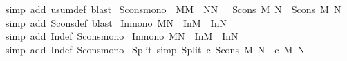 \begin{isabellebody}
%
\isadelimproof
%
\endisadelimproof
%
\isatagproof
{}\isamarkupfalse%
\ {\isacharparenleft}simp\ add{\isacharcolon}\ usum{\isacharunderscore}def{\isacharcomma}\ blast{\isacharparenright}%
\endisatagproof
{\isafoldproof}%
%
\isadelimproof
\isanewline
%
\endisadelimproof
\isanewline
{}\isamarkupfalse%
\ Scons{\isacharunderscore}mono{\isacharcolon}\ {\isachardoublequoteopen}{\isacharbrackleft}{\isacharbar}\ M{\isacharless}{\isacharequal}M{\isacharprime}{\isacharsemicolon}\ \ N{\isacharless}{\isacharequal}N{\isacharprime}\ {\isacharbar}{\isacharbrackright}\ {\isacharequal}{\isacharequal}{\isachargreater}\ Scons\ M\ N\ {\isacharless}{\isacharequal}\ Scons\ M{\isacharprime}\ N{\isacharprime}{\isachardoublequoteclose}\isanewline
%
\isadelimproof
%
\endisadelimproof
%
\isatagproof
{}\isamarkupfalse%
\ {\isacharparenleft}simp\ add{\isacharcolon}\ Scons{\isacharunderscore}def{\isacharcomma}\ blast{\isacharparenright}%
\endisatagproof
{\isafoldproof}%
%
\isadelimproof
\isanewline
%
\endisadelimproof
\isanewline
{}\isamarkupfalse%
\ In{}{\isacharunderscore}mono{\isacharcolon}\ {\isachardoublequoteopen}M{\isacharless}{\isacharequal}N\ {\isacharequal}{\isacharequal}{\isachargreater}\ In{}{\isacharparenleft}M{\isacharparenright}\ {\isacharless}{\isacharequal}\ In{}{\isacharparenleft}N{\isacharparenright}{\isachardoublequoteclose}\isanewline
%
\isadelimproof
%
\endisadelimproof
%
\isatagproof
{}\isamarkupfalse%
\ {\isacharparenleft}simp\ add{\isacharcolon}\ In{}{\isacharunderscore}def\ Scons{\isacharunderscore}mono{\isacharparenright}%
\endisatagproof
{\isafoldproof}%
%
\isadelimproof
\isanewline
%
\endisadelimproof
\isanewline
{}\isamarkupfalse%
\ In{}{\isacharunderscore}mono{\isacharcolon}\ {\isachardoublequoteopen}M{\isacharless}{\isacharequal}N\ {\isacharequal}{\isacharequal}{\isachargreater}\ In{}{\isacharparenleft}M{\isacharparenright}\ {\isacharless}{\isacharequal}\ In{}{\isacharparenleft}N{\isacharparenright}{\isachardoublequoteclose}\isanewline
%
\isadelimproof
%
\endisadelimproof
%
\isatagproof
{}\isamarkupfalse%
\ {\isacharparenleft}simp\ add{\isacharcolon}\ In{}{\isacharunderscore}def\ Scons{\isacharunderscore}mono{\isacharparenright}%
\endisatagproof
{\isafoldproof}%
%
\isadelimproof
\isanewline
%
\endisadelimproof
\isanewline
\isanewline
\isanewline
\isanewline
{}\isamarkupfalse%
\ Split\ {\isacharbrackleft}simp{\isacharbrackright}{\isacharcolon}\ {\isachardoublequoteopen}Split\ c\ {\isacharparenleft}Scons\ M\ N{\isacharparenright}\ {\isacharequal}\ c\ M\ N{\isachardoublequoteclose}\isanewline

\end{isabellebody}
